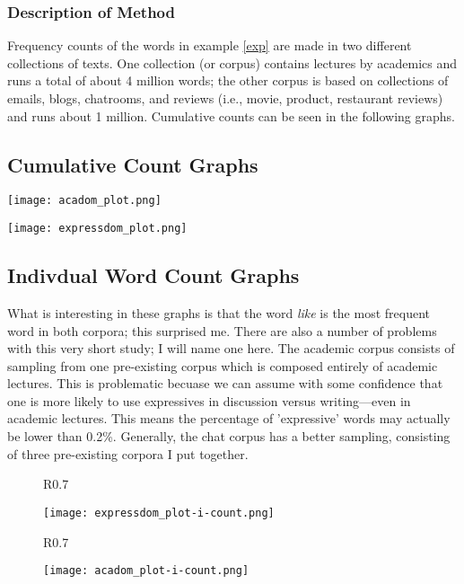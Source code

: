 \documentclass[11pt,twoside]{article}
\begin{document}
\subsubsection{Description of Method}
Frequency counts of the words in example \ref{exp} are made in two different collections of texts. One collection (or corpus) contains lectures by academics and runs a total of about 4 million words; the other corpus is based on collections of emails, blogs, chatrooms, and reviews (i.e., movie, product, restaurant reviews) and runs about 1 million. Cumulative counts can be seen in the following graphs.
\subsection{Cumulative Count Graphs}

        \texttt{[image: acadom\_plot.png]}

        \texttt{[image: expressdom\_plot.png]}

\subsection{Indivdual Word Count Graphs}  
What is interesting in these graphs is that the word \textsl{like} is the most frequent word in both corpora; this surprised me. There are also a number of problems with this very short study; I will name one here. The academic corpus consists of sampling from one pre-existing corpus which is composed entirely of academic lectures. This is problematic becuase we can assume with some confidence that one is more likely to use expressives in discussion versus writing---even in academic lectures. This means the percentage of 'expressive' words may actually be lower than 0.2\%. Generally, the chat corpus has a better sampling, consisting of three pre-existing corpora I put together. 

\begin{figure}[!h]
   \begin{wrapfigure}{R}{0.7\textwidth}
         \vspace{-1cm}
        \begin{center}
        \texttt{[image: expressdom\_plot-i-count.png]}
        \end{center}
         \vspace{-1cm}
    \end{wrapfigure}
    \end{figure}    	 
\begin{figure}[!h]
   \begin{wrapfigure}{R}{0.7\textwidth}
         \vspace{-1cm}
        \begin{center}
        \texttt{[image: acadom\_plot-i-count.png]}
        \end{center}
         \vspace{-1cm}
    \end{wrapfigure}
    \end{figure}   	
  
\end{document}
